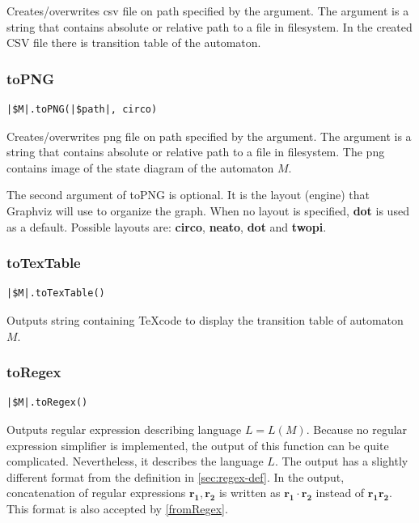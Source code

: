 \documentclass{ctuthesis}
\begin{document}
Creates/overwrites csv file on path specified by the argument. The argument is a string that contains absolute or relative path to a file in filesystem. In the created CSV file there is transition table of the automaton.

\subsubsection{toPNG}
\begin{lstlisting}[language = JASL_snippet]
	|$M|.toPNG(|$path|, circo)
\end{lstlisting}

Creates/overwrites png file on path specified by the argument. The argument is a string that contains absolute or relative path to a file in filesystem. The png contains image of the state diagram of the automaton $M$. 

The second argument of toPNG is optional. It is the layout (engine) that Graphviz will use to organize the graph. When no layout is specified, \textbf{dot} is used as a default. Possible layouts are: \textbf{circo}, \textbf{neato}, \textbf{dot} and \textbf{twopi}.

\subsubsection{toTexTable}
\begin{lstlisting}[language = JASL_snippet]
	|$M|.toTexTable()
\end{lstlisting}

Outputs string containing \TeX code to display the transition table of automaton $M$. 

\subsubsection{toRegex}
\label{toRegex}
\begin{lstlisting}[language = JASL_snippet]
	|$M|.toRegex()
\end{lstlisting}

Outputs regular expression describing language $L = L(M)$. Because no regular expression simplifier is implemented, the output of this function can be quite complicated. Nevertheless, it describes the language $L$. The output has a slightly different format from the definition in \ref{sec:regex-def}. In the output, concatenation of regular expressions $\mathbf{r_1}, \mathbf{r_2}$ is written as $\mathbf{r_1}\cdot \mathbf{r_2}$ instead of $\mathbf{r_1r_2}$. This format is also accepted by \ref{fromRegex}.
\end{document}
